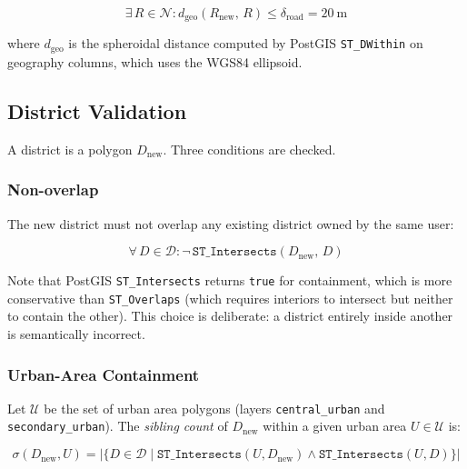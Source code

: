 \documentclass[12pt,a4paper]{article}
\theoremstyle{definition}
\theoremstyle{plain}
\theoremstyle{remark}
\newcommand{\abs}[1]{\left\lvert #1 \right\rvert}
\begin{document}
\begin{equation}
  \exists\, R \in \mathcal{N}:
  d_{\text{geo}}\!\left(R_{\text{new}},\, R\right) \leq \delta_{\text{road}} = 20\ \mathrm{m}
  \label{eq:road_connectivity}
\end{equation}

where $d_{\text{geo}}$ is the spheroidal distance computed by PostGIS
\texttt{ST\_DWithin} on geography columns, which uses the WGS84 ellipsoid.

\subsection{District Validation}
\label{sec:district_validation}

A district is a polygon $D_{\text{new}}$. Three conditions are checked.

\subsubsection{Non-overlap}

The new district must not overlap any existing district owned by the same
user:

\begin{equation}
  \forall\, D \in \mathcal{D}:
  \neg\, \texttt{ST\_Intersects}(D_{\text{new}},\, D)
  \label{eq:district_no_overlap}
\end{equation}

Note that PostGIS \texttt{ST\_Intersects} returns \texttt{true} for
containment, which is more conservative than \texttt{ST\_Overlaps} (which
requires interiors to intersect but neither to contain the other). This
choice is deliberate: a district entirely inside another is semantically
incorrect.

\subsubsection{Urban-Area Containment}

Let $\mathcal{U}$ be the set of urban area polygons (layers
\texttt{central\_urban} and \texttt{secondary\_urban}). The \emph{sibling
count} of $D_{\text{new}}$ within a given urban area $U \in \mathcal{U}$ is:

\begin{equation}
  \sigma(D_{\text{new}}, U) = \abs{\{
    D \in \mathcal{D} \mid
    \texttt{ST\_Intersects}(U, D_{\text{new}}) \land
    \texttt{ST\_Intersects}(U, D)
  \}}
  \label{eq:sibling_count}
\end{equation}
\end{document}
